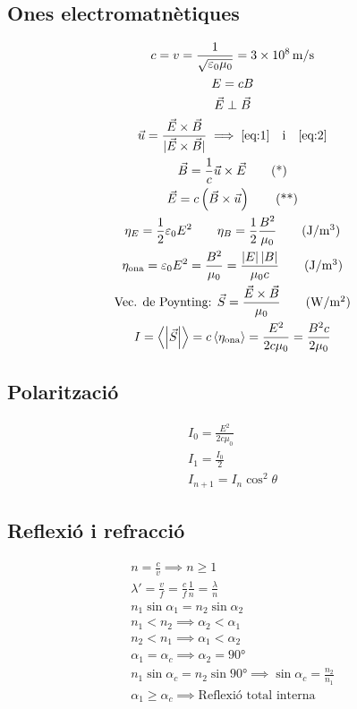 \documentclass[10pt,twocolumn]{article}
\begin{document}
\subsection{Ones electromatnètiques}
\begin{gather*}
    c = v = \frac{1}{\sqrt{\varepsilon_0 \mu_0}} = \SI{3e8}{\meter/\second} \\
    E = cB \\
    \vec{E} \perp \vec{B} \\
    \vec{u} = \frac{\vec{E}\times\vec{B}}{|\vec{E}\times\vec{B}|} \implies \ref{eq:1} \quad \text{i} \quad \ref{eq:2}\\
    \vec{B} = \frac{1}{c}\vec{u}\times\vec{E}\tag{*}\label{eq:1} \\
    \vec{E} = c\left(\vec{B}\times\vec{u}\right) \tag{**}\label{eq:2} \\
    \eta_E = \frac{1}{2}\varepsilon_0 E^2 \qquad \eta_B = \frac{1}{2} \frac{B^2}{\mu_0} \tag{\si{J/m^3}}\\
    \eta_\text{ona} = \varepsilon_0E^2 = \frac{B^2}{\mu_0} = \frac{\left|E\right|\left|B\right|}{\mu_0 c} \tag{\si{J/m^3}} \\
    \text{Vec. de Poynting: } \vec{S} = \frac{\vec{E}\times\vec{B}}{\mu_0} \tag{\si{W/m^2}} \\
    I = \left<\left|\vec{S}\right|\right> = c\left<\eta_\text{ona}\right> = \frac{E^2}{2c\mu_0} = \frac{B^2 c}{2\mu_0}
\end{gather*}
\subsection{Polarització}
\begin{gather*}
    I_0 = \frac{E^2}{2c\mu_0} \\
    I_1 = \frac{I_0}{2} \\
    I_{n+1} = I_n \cos^2 \theta
\end{gather*}
\subsection{Reflexió i refracció}
\begin{gather*}
n = \frac{c}{v} \implies n \geq 1 \\
\lambda' = \frac{v}{f} = \frac{c}{f}\frac{1}{n} = \frac{\lambda}{n} \\
n_1\sin \alpha_1 = n_2\sin \alpha_2 \\
n_1 < n_2 \implies \alpha_2 < \alpha_1 \\
n_2 < n_1 \implies \alpha_1 < \alpha_2 \\
\alpha_1 = \alpha_c \implies \alpha_2 = \ang{90} \\
n_1\sin \alpha_c = n_2\sin \ang{90} \implies \sin \alpha_c = \frac{n_2}{n_1} \\
\alpha_1 \geq \alpha_c \implies \text{Reflexió total interna}
\end{gather*}
\end{document}
